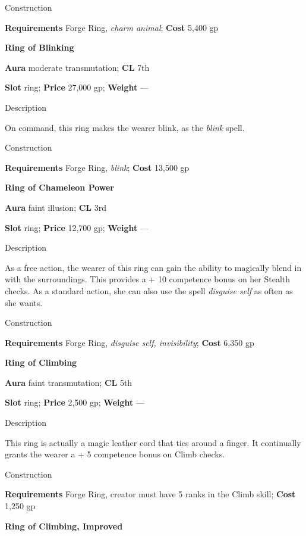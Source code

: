 Construction
				
\textbf{Requirements} Forge Ring, \textit{charm animal}; \textbf{Cost }5,400 gp
				
\textbf{Ring of Blinking}
				
\textbf{Aura} moderate transmutation;\textbf{ CL }7th
				
\textbf{Slot} ring; \textbf{Price} 27,000 gp; \textbf{Weight} ---
				
Description
				
On command, this ring makes the wearer blink, as the \textit{blink }spell. 
				
Construction
				
\textbf{Requirements} Forge Ring, \textit{blink}; \textbf{Cost }13,500 gp
				
\textbf{Ring of Chameleon Power}
				
\textbf{Aura} faint illusion;\textbf{ CL }3rd
				
\textbf{Slot} ring; \textbf{Price} 12,700 gp; \textbf{Weight} ---
				
Description
				
As a free action, the wearer of this ring can gain the ability 
to magically blend
 in with the surroundings. This provides a +
10 competence
 bonus on her Stealth checks. As a standard action, she can also use the spell \textit{disguise self }as often as she wants. 
				
Construction
				
\textbf{Requirements} Forge Ring, \textit{disguise self, invisibility}; \textbf{Cost }6,350 gp
				
\textbf{Ring of Climbing}
				
\textbf{Aura} faint transmutation;\textbf{ CL }5th
				
\textbf{Slot} ring; \textbf{Price} 2,500 gp; \textbf{Weight} ---
				
Description
				
This ring is actually a magic leather cord that ties around a finger. It continually grants the wearer a +
5 competence
 bonus on Climb checks. 
				
Construction
				
\textbf{Requirements} Forge Ring, creator must have 5 ranks in the Climb skill; \textbf{Cost }1,250 gp
				
\textbf{Ring of Climbing, Improved}
				
